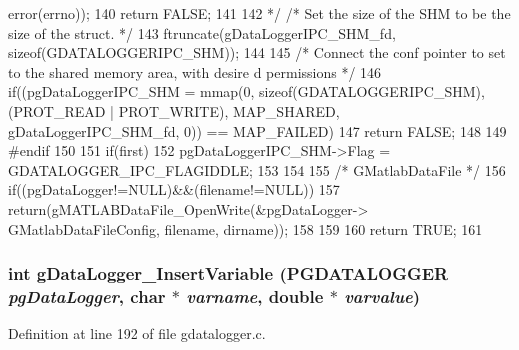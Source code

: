 \begin{DoxyCode}
{{      error(errno));
140                 return FALSE;
141         } 
142 */      /* Set the size of the SHM to be the size of the struct. */
143         ftruncate(gDataLoggerIPC_SHM_fd, sizeof(GDATALOGGERIPC_SHM));
144 
145         /* Connect the conf pointer to set to the shared memory area, with desire
      d permissions */
146         if((pgDataLoggerIPC_SHM =  mmap(0, sizeof(GDATALOGGERIPC_SHM), (PROT_READ
       | PROT_WRITE), MAP_SHARED, gDataLoggerIPC_SHM_fd, 0)) == MAP_FAILED) {
147                 return FALSE;
148         }
149 #endif
150         
151         if(first){
152                 pgDataLoggerIPC_SHM->Flag = GDATALOGGER_IPC_FLAGIDDLE;
153         }
154 
155         /* GMatlabDataFile */
156         if((pgDataLogger!=NULL)&&(filename!=NULL)){
157                 return(gMATLABDataFile_OpenWrite(&pgDataLogger->
      GMatlabDataFileConfig, filename, dirname));
158         }
159         
160         return TRUE;
161 }
\end{DoxyCode}
\subsubsection[{gDataLogger\_\-InsertVariable}]{\setlength{\rightskip}{0pt plus 5cm}int gDataLogger\_\-InsertVariable ({\bf PGDATALOGGER} {\em pgDataLogger}, \/  char $\ast$ {\em varname}, \/  double $\ast$ {\em varvalue})}\label{gdatalogger_8c_a32674e7c2afa8b78e99a0070cf4bcaf9}


Definition at line 192 of file gdatalogger.c.


